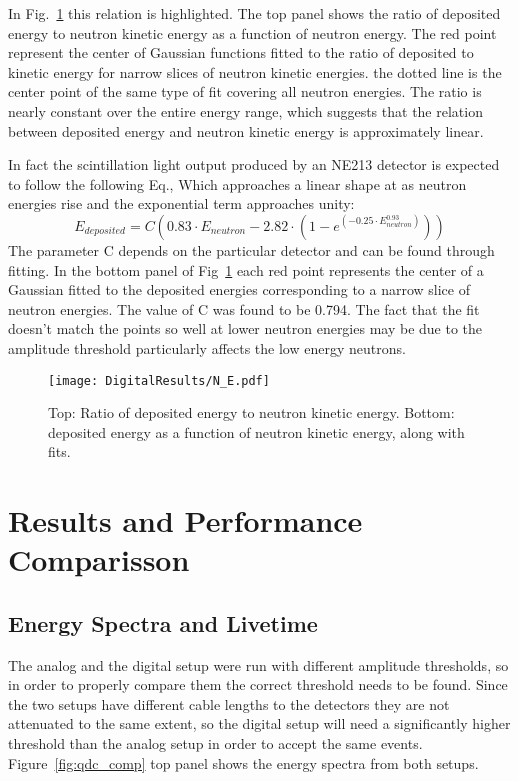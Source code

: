 \documentclass[main.tex]{subfiles}
\begin{document}
In Fig.~\ref{fig:N_E} this relation is highlighted. The top panel shows the ratio of deposited energy to neutron kinetic energy as a function of neutron energy. The red point represent the center of Gaussian functions fitted to the ratio of deposited to kinetic energy for narrow slices of neutron kinetic energies. the dotted line is the center point of the same type of fit covering all neutron energies. The ratio is nearly constant over the entire energy range, which suggests that the relation between deposited energy and neutron kinetic energy is approximately linear.

In fact the scintillation light output produced by an NE213 detector is expected to follow the following Eq.\cite{Scherzinger:2016}, Which approaches a linear shape at as neutron energies rise and the exponential term approaches unity:
\begin{equation}
	E_{deposited} = C\left(  0.83\cdot E_{neutron} - 2.82\cdot\left(  1 - e^{(-0.25\cdot E_{neutron}^{0.93})}  \right)  \right)
\end{equation}
The parameter C depends on the particular detector and can be found through fitting. In the bottom panel of Fig~\ref{fig:N_E} each red point represents the center of a Gaussian fitted to the deposited energies corresponding to a narrow slice of neutron energies. The value of C was found to be 0.794. The fact that the fit doesn't match the points so well at lower neutron energies may be due to the amplitude threshold particularly affects the low energy neutrons.

\begin{figure}[ht]
    \centering
        \texttt{[image: DigitalResults/N\_E.pdf]}
        \caption[Neutron kinetic energy and deposited energy.]{Top: Ratio of deposited energy to neutron kinetic energy. Bottom: deposited energy as a function of neutron kinetic energy, along with fits.}
    \label{fig:N_E} 
\end{figure}
\newpage
\section{Results and Performance Comparisson}\label{sec:comp}
\subsection{Energy Spectra and Livetime}
The analog and the digital setup were run with different amplitude thresholds, so in order to properly compare them the correct threshold needs to be found. Since the two setups have different cable lengths to the detectors they are not attenuated to the same extent, so the digital setup will need a significantly higher threshold than the analog setup in order to accept the same events. Figure~\ref{fig:qdc_comp} top panel shows the energy spectra from both setups.
\end{document}
